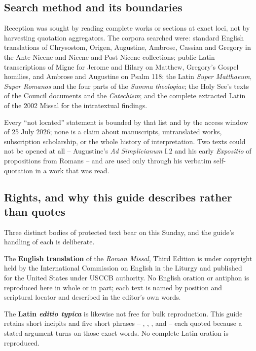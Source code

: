 \subsection*{Search method and its boundaries}

Reception was sought by reading complete works or sections at exact loci, not by harvesting quotation aggregators. The corpora searched were: standard English translations of Chrysostom, Origen, Augustine, Ambrose, Cassian and Gregory in the Ante-Nicene and Nicene and Post-Nicene collections; public Latin transcriptions of Migne for Jerome and Hilary on Matthew, Gregory's Gospel homilies, and Ambrose and Augustine on Psalm 118; the Latin \emph{Super Matthaeum}, \emph{Super Romanos} and the four parts of the \emph{Summa theologiae}; the Holy See's texts of the Council documents and the \emph{Catechism}; and the complete extracted Latin of the 2002 Missal for the intratextual findings.

Every ``not located'' statement is bounded by that list and by the access window of 25 July 2026; none is a claim about manuscripts, untranslated works, subscription scholarship, or the whole history of interpretation. Two texts could not be opened at all -- Augustine's \emph{Ad Simplicianum} I.2 and his early \emph{Expositio} of propositions from Romans -- and are used only through his verbatim self-quotation in a work that was read.

\subsection*{Rights, and why this guide describes rather than quotes}

Three distinct bodies of protected text bear on this Sunday, and the guide's handling of each is deliberate.

The \textbf{English translation} of the \emph{Roman Missal}, Third Edition is under copyright held by the International Commission on English in the Liturgy and published for the United States under USCCB authority. No English oration or antiphon is reproduced here in whole or in part; each text is named by position and scriptural locator and described in the editor's own words.

The \textbf{Latin \emph{editio typica}} is likewise not free for bulk reproduction. This guide retains short incipits and five short phrases -- , , ,  and  -- each quoted because a stated argument turns on those exact words. No complete Latin oration is reproduced.

